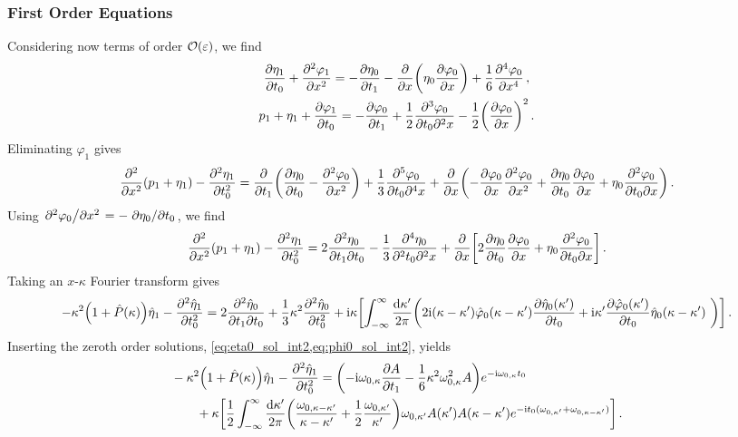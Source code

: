 \documentclass{jfm}
\let\Oldsubsubsection\subsubsection
\renewcommand{\subsubsection}{\FloatBarrier\Oldsubsubsection}
\newcommand{\GenPk}{\hat{P}(\kappa)}
\newcommand{\im}{\mathrm{i}}
\renewcommand*{\epsilon}{\varepsilon}
\begin{document}
\subsubsection{First Order Equations}
Considering now terms of order $\order{\epsilon}$, we find
\begin{gather}
    \pdv{\eta_1}{t_0} + \pdv[2]{\varphi_{1}}{x} =
      -\pdv{\eta_0}{t_1} - \pdv{x} \pqty{\eta_0 \pdv{\varphi_0}{x}} +
      \frac{1}{6} \pdv[4]{\varphi_0}{x} \,, \\
    p_1 + \eta_1 + \pdv{\varphi_1}{t_0} = - \pdv{\varphi_0}{t_1}
      + \frac{1}{2} \frac{\partial^3 \varphi_0}{\partial t_0 \partial^2 x}
      - \frac{1}{2} \pqty{ \pdv{\varphi_0}{x} }^2     \,.
\end{gather}
Eliminating $\varphi_1$ gives
\begin{equation}
    \pdv[2]{x} \pqty{p_1 + \eta_1} - \pdv[2]{\eta_1}{t_0} =
      \pdv{t_1} \pqty{ \pdv{\eta_0}{t_0} - \pdv[2]{\varphi_0}{x} }
      + \frac{1}{3} \frac{\partial^5 \varphi_0}{\partial t_0 \partial^4
      x}
      + \pdv{x} \pqty{ -\pdv{\varphi_0}{x} \pdv[2]{\varphi_0}{x} +
      \pdv{\eta_0}{t_0} \pdv{\varphi_0}{x} + \eta_0
      \pdv{\varphi_0}{t_0}{x} } \,.
\end{equation}
Using $\pdv*[2]{\varphi_0}{x} = -\pdv*{\eta_0}{t_0}$, we find
\begin{equation}
  \pdv[2]{x} \pqty{p_1 + \eta_1} - \pdv[2]{\eta_1}{t_0} =
    2 \pdv{\eta_0}{t_1}{t_0}
    - \frac{1}{3} \frac{\partial^4 \eta_0}{\partial^2 t_0 \partial^2 x}
    + \pdv{x} \bqty{2 \pdv{\eta_0}{t_0} \pdv{\varphi_0}{x}
    + \eta_0 \pdv{\varphi_0}{t_0}{x}} \,.
\end{equation}
Taking an $x$-$\kappa$ Fourier transform gives
\begin{equation}
  -\kappa^2 \pqty{1 + \GenPk} \hat{\eta}_1 - \pdv[2]{\hat{\eta}_1}{t_0}
  = 2 \pdv{\hat{\eta}_0}{t_1}{t_0}
    + \frac{1}{3} \kappa^2 \pdv[2]{\hat{\eta}_0}{t_0}
    + \im \kappa \bqty{\int_{-\infty}^{\infty}
      \frac{\dd{\kappa'}}{2 \pi}
    \pqty{
      2 \im (\kappa-\kappa') \hat{\varphi}_0(\kappa-\kappa')
      \pdv{\hat{\eta}_0(\kappa')}{t_0}
      + \im \kappa' \pdv{\hat{\varphi}_0(\kappa')}{t_0}
      \hat{\eta}_0(\kappa-\kappa') \
    } } \,.
\end{equation}
Inserting the zeroth order solutions,
\cref{eq:eta0_sol_int2,eq:phi0_sol_int2}, yields
\begin{equation}
  \begin{split}
  &-\kappa^2 \pqty{1 + \GenPk} \hat{\eta}_1 - \pdv[2]{\hat{\eta}_1}{t_0}
    = \pqty{ -\im \omega_{0,\kappa} \pdv{A}{t_1}
    - \frac{1}{6} \kappa^2 \omega_{0,\kappa}^2 A }
    e^{-\im \omega_{0,\kappa} t_0} \\
    &\qquad
    + \kappa \bqty{\frac{1}{2} \int_{-\infty}^{\infty}
      \frac{\dd{\kappa'}}{2 \pi}
    \pqty{
      \frac{\omega_{0,\kappa-\kappa'}}{\kappa-\kappa'}
      + \frac{1}{2} \frac{\omega_{0,\kappa'}}{\kappa'}
    } \omega_{0,\kappa'} A(\kappa') A(\kappa-\kappa')
    e^{-\im t_0 (\omega_{0,\kappa'} + \omega_{0,\kappa-\kappa'})} } \,.
  \end{split}
  \label{eq:strong_first_order_int2}
\end{equation}
\end{document}
